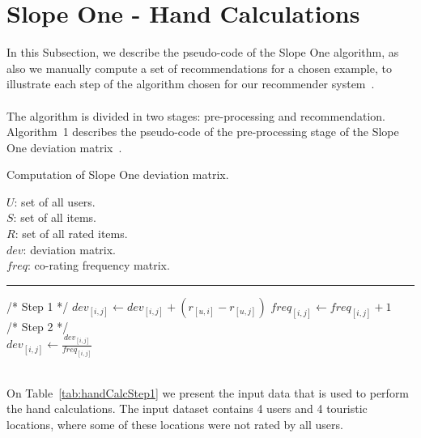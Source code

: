 \section{Slope One - Hand Calculations}
\label{sec:slopeOneHandCalculations}
In this Subsection, we describe the pseudo-code of the Slope One algorithm, as also we manually compute a set of recommendations for a chosen example, to illustrate each step of the algorithm chosen for our recommender system~\cite{mahoutInAction}.\\
\\
The algorithm is divided in two stages: pre-processing and recommendation. Algorithm~1 describes the pseudo-code of the pre-processing stage of the Slope One deviation matrix~\cite{slopeOneWeighted}.\\
\begin{algorithm}[h!]
\label{alg:SlopeOneMatrix}
\begin{algorithmic}[1]
{\small
\caption{Computation of Slope One deviation matrix.}
	\REQUIRE \hspace{.2cm} $U$: set of all users.\\
 	\indent \hspace{.8cm}  $S$: set of all items.\\
	\indent \hspace{.8cm}  $R$: set of all rated items.\\
	\ENSURE $dev$: deviation matrix.\\
	\indent \hspace{.7cm} $freq$: co-rating frequency matrix.\\
	\vspace{1mm} \hrule \vspace{1mm}	\small
	/* Step 1 */
				\STATE $dev_{[i,j]} \leftarrow dev_{[i,j]} + (r_{[u,i]} - r_{[u,j]})$
				\STATE $freq_{[i,j]} \leftarrow freq_{[i,j]} + 1$
			\ENDFOR	
		\ENDFOR	
	\ENDFOR		
	\\
	/* Step 2 */
	\\
	  		\STATE $dev_{[i,j]} \leftarrow \frac{dev_{[i,j]}}{freq_{[i,j]}}$
		\ENDFOR	
	\ENDFOR				
}
\end{algorithmic}
\end{algorithm}\\
On Table~\ref{tab:handCalcStep1} we present the input data that is used to perform the hand calculations. The input dataset contains 4 users and 4 touristic locations, where some of these locations were not rated by all users.
